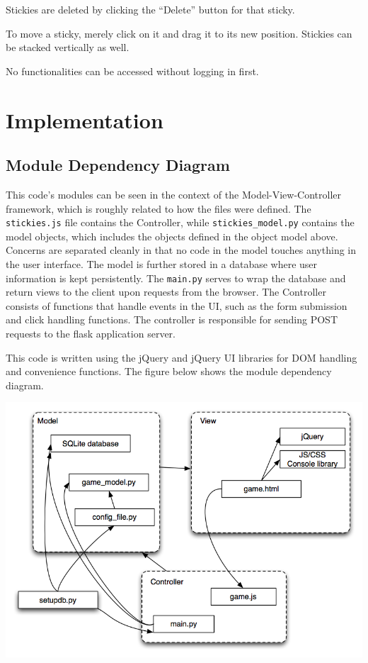 \documentclass[11pt,letterpaper]{article}
\begin{document}
Stickies are deleted by clicking the ``Delete'' button for that sticky.

To move a sticky, merely click on it and drag it to its new position. Stickies can be stacked vertically as well.

No functionalities can be accessed without logging in first.

\section{Implementation}

\subsection{Module Dependency Diagram}
This code's modules can be seen in the context of the Model-View-Controller framework, which is roughly related to how the files were defined. The \texttt{stickies.js} file contains the Controller, while \texttt{stickies\_model.py} contains the model objects, which includes the objects defined in the object model above. Concerns are separated cleanly in that no code in the model touches anything in the user interface. The model is further stored in a database where user information is kept persistently. The \texttt{main.py} serves to wrap the database and return views to the client upon requests from the browser. The Controller consists of functions that handle events in the UI, such as the form submission and click handling functions. The controller is responsible for sending POST requests to the flask application server.

This code is written using the jQuery and jQuery UI libraries for DOM handling and convenience functions. The figure below shows the module dependency diagram.

\begin{center}
\includegraphics[width=400pt]{dot/moddep.png}
\label{fig:ob2} 
\end{center}
\end{document}
